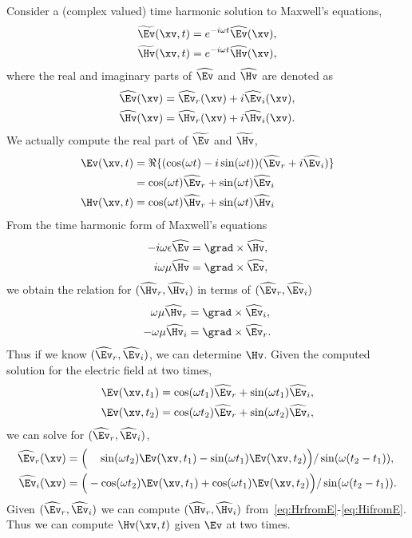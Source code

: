 Consider a (complex valued) time harmonic solution to Maxwell's equations,
\begin{align*}
   \Etv(\xv,t) &= e^{-i\omega t}\Ehv(\xv),\\
   \Htv(\xv,t) &= e^{-i\omega t}\Hhv(\xv),
\end{align*}
where the real and imaginary parts of $\Ehv$ and $\Hhv$ are denoted as
\begin{align*}
   \Ehv(\xv) &= \Ehrv(\xv) + i \Ehiv(\xv),\\
   \Hhv(\xv) &= \Hhrv(\xv) + i \Hhiv(\xv) .
\end{align*}
We actually compute the real part of $\Etv$ and $\Htv$,
\begin{align*}
   \Ev(\xv,t) &= \Re\{ (\cos(\omega t)-i\sin(\omega t))(\Ehrv + i \Ehiv)  \}  \\
               &= \cos(\omega t)\Ehrv + \sin(\omega t) \Ehiv\\
   \Hv(\xv,t) &=\cos(\omega t)\Hhrv + \sin(\omega t) \Hhiv
\end{align*}
From the time harmonic form of Maxwell's equations
\begin{align*}
  -i\omega \eps\Ehv &= \grad\times \Hhv, \\
  i\omega \mu \Hhv &=  \grad\times \Ehv, 
\end{align*}
we obtain the relation for $(\Hhrv,\Hhiv)$ in terms of $(\Ehrv,\Ehiv)$
\begin{align}
   \omega\mu \Hhrv &= \grad\times \Ehiv, \label{eq:HrfromE}\\
  -\omega\mu \Hhiv &= \grad\times \Ehrv.\label{eq:HifromE}
\end{align}
Thus if we know $(\Ehrv,\Ehiv)$, we can determine $\Hv$.
% 
Given the computed solution for the electric field at two times,
\begin{align*}
\Ev(\xv,t_1) &= \cos(\omega t_1)\Ehrv + \sin(\omega t_1) \Ehiv, \\
\Ev(\xv,t_2) &= \cos(\omega t_2)\Ehrv + \sin(\omega t_2) \Ehiv, 
\end{align*}
we can solve for $(\Ehrv,\Ehiv)$,
\begin{align}
  \Ehrv(\xv) &= \Big(~~~\sin(\omega t_2)\Ev(\xv,t_1) -\sin(\omega t_1)\Ev(\xv,t_2) \Big)/\sin(\omega (t_2-t_1)),  \label{eq:Ehrv} \\
  \Ehiv(\xv) &= \Big(  -\cos(\omega t_2)\Ev(\xv,t_1) +\cos(\omega t_1)\Ev(\xv,t_2) \Big)/\sin(\omega (t_2-t_1)) . \label{eq:Ehiv}
\end{align}
Given $(\Ehrv,\Ehiv)$ we can compute $(\Hhrv,\Hhiv)$ from~\eqref{eq:HrfromE}-\eqref{eq:HifromE}. 
Thus we can compute $\Hv(\xv,t)$ given $\Ev$ at two times. 

